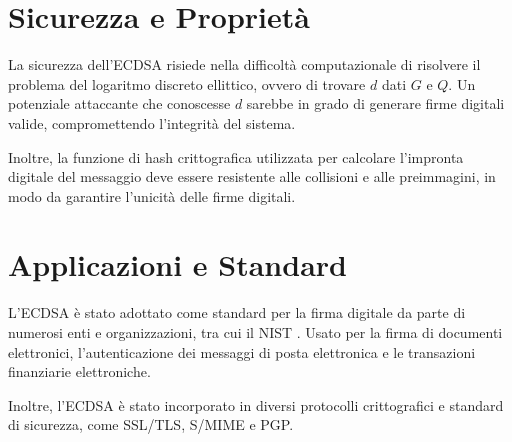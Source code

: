 \documentclass[a4paper,12pt]{report}
\begin{document}
\section{Sicurezza e Proprietà}
La sicurezza dell'ECDSA risiede nella difficoltà computazionale di risolvere il problema del logaritmo discreto ellittico, ovvero di trovare $d$ dati $G$ e $Q$. Un potenziale attaccante che conoscesse $d$ sarebbe in grado di generare firme digitali valide, compromettendo l'integrità del sistema.

Inoltre, la funzione di hash crittografica utilizzata per calcolare l'impronta digitale del messaggio deve essere resistente alle collisioni e alle preimmagini, in modo da garantire l'unicità delle firme digitali.

\section{Applicazioni e Standard}
L'ECDSA è stato adottato come standard per la firma digitale da parte di numerosi enti e organizzazioni, tra cui il NIST \cite{nist}. Usato per la firma di documenti elettronici, l'autenticazione dei messaggi di posta elettronica e le transazioni finanziarie elettroniche.

Inoltre, l'ECDSA è stato incorporato in diversi protocolli crittografici e standard di sicurezza, come SSL/TLS, S/MIME e PGP.


\nocite{*}


\end{document}

